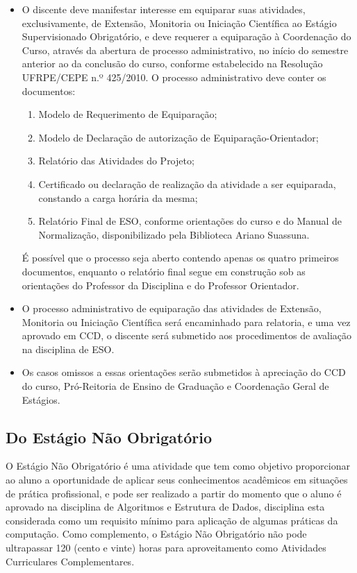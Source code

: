 \documentclass[
	12pt,				%
	openright,			%
  oneside,     %
	a4paper,			%
	english,			%
	french,				%
	spanish,			%
	brazil				%
	]{abntex2}
\begin{document}
\begin{itemize}
    \item O discente deve manifestar interesse em equiparar suas atividades, exclusivamente, de Extensão, Monitoria ou Iniciação Científica ao Estágio Supervisionado Obrigatório, e deve requerer a equiparação à Coordenação do Curso, através da abertura de processo administrativo, no início do semestre anterior ao da conclusão do curso, conforme estabelecido na Resolução UFRPE/CEPE n.º 425/2010. O processo administrativo deve conter os documentos:

    \begin{enumerate}
        \item Modelo de Requerimento de Equiparação;
	\item Modelo de Declaração de autorização de Equiparação-Orientador;
	\item Relatório das Atividades do Projeto;
	\item Certificado ou declaração de realização da atividade a ser equiparada, constando a carga horária da mesma;
	\item Relatório Final de ESO, conforme orientações do curso e do Manual de Normalização, disponibilizado pela Biblioteca Ariano Suassuna.
    \end{enumerate}

    É possível que o processo seja aberto contendo apenas os quatro primeiros documentos, enquanto o relatório final segue em construção sob as orientações do Professor da Disciplina e do Professor Orientador.
    
    \item O processo administrativo de equiparação das atividades de Extensão, Monitoria ou Iniciação Científica será encaminhado para relatoria, e uma vez aprovado em CCD, o discente será submetido aos procedimentos de avaliação na disciplina de ESO.
    \item Os casos omissos a essas orientações serão submetidos à apreciação do CCD do curso, Pró-Reitoria de Ensino de Graduação e Coordenação Geral de Estágios.
\end{itemize}

\subsection{Do Estágio Não Obrigatório}

O Estágio Não Obrigatório é uma atividade que tem como objetivo proporcionar ao aluno a oportunidade de aplicar seus conhecimentos acadêmicos em situações de prática profissional, e pode ser realizado a partir do momento que o aluno é aprovado na disciplina de Algoritmos e Estrutura de Dados, disciplina esta considerada como um requisito mínimo para aplicação de algumas práticas da computação. Como complemento, o Estágio Não Obrigatório não pode ultrapassar 120 (cento e vinte) horas para aproveitamento como Atividades Curriculares Complementares.
\end{document}
